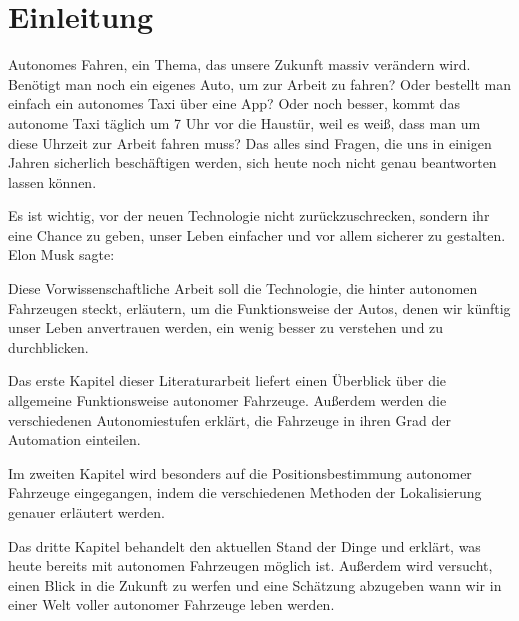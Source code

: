 \chapter{Einleitung}

Autonomes Fahren, ein Thema, das unsere Zukunft massiv verändern wird. Benötigt man noch ein eigenes Auto, um zur Arbeit zu fahren? Oder bestellt man einfach ein autonomes Taxi über eine App? Oder noch besser, kommt das autonome Taxi täglich um 7 Uhr vor die Haustür, weil es weiß, dass man um diese Uhrzeit zur Arbeit fahren muss? Das alles sind Fragen, die uns in einigen Jahren sicherlich beschäftigen werden, sich heute noch nicht genau beantworten lassen können.

Es ist wichtig, vor der neuen Technologie nicht zurückzuschrecken, sondern ihr eine Chance zu geben, unser Leben einfacher und vor allem sicherer zu gestalten. Elon Musk sagte: 

\bigskip

Diese Vorwissenschaftliche Arbeit soll die Technologie, die hinter autonomen Fahrzeugen steckt, erläutern, um die Funktionsweise der Autos, denen wir künftig unser Leben anvertrauen werden, ein wenig besser zu verstehen und zu durchblicken.

Das erste Kapitel dieser Literaturarbeit liefert einen Überblick über die allgemeine Funktionsweise autonomer Fahrzeuge. Außerdem werden die verschiedenen Autonomiestufen erklärt, die Fahrzeuge in ihren Grad der Automation einteilen.

Im zweiten Kapitel wird besonders auf die Positionsbestimmung autonomer Fahrzeuge eingegangen, indem die verschiedenen Methoden der Lokalisierung genauer erläutert werden.

Das dritte Kapitel behandelt den aktuellen Stand der Dinge und erklärt, was heute bereits mit autonomen Fahrzeugen möglich ist. Außerdem wird versucht, einen Blick in die Zukunft zu werfen und eine Schätzung abzugeben wann wir in einer Welt voller autonomer Fahrzeuge leben werden.
